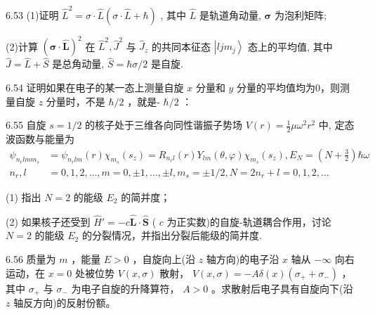 \vfill\newpage

6.53 (1)证明 $\hat{L}^2 = \sigma \cdot \hat{L} (\sigma \cdot \hat{L} +\hbar)$ , 其中 $\hat{L}$ 是轨道角动量, $\pmb{\sigma}$ 为泡利矩阵; 

(2)计算 $(\pmb {\sigma}\cdot \hat{\pmb{L}})^2$ 在 $\hat{L}^2,\hat{J}^2$ 与 $\hat{J}_z$ 的共同本征态 $\left|ljm_j\right\rangle$ 态上的平均值, 其中 $\hat{J} = \hat{L} +\hat{S}$ 是总角动量, $\hat{S} = \hbar \sigma /2$ 是自旋.

\vfill\newpage

6.54 证明如果在电子的某一态上测量自旋 $x$ 分量和 $y$ 分量的平均值均为0，则测量自旋 $z$ 分量时，不是 $\hbar /2$ ，就是- $\hbar /2$ ：

\vfill\newpage

6.55 自旋 $s = 1 / 2$ 的核子处于三维各向同性谐振子势场 $V(r) = \frac{1}{2}\mu \omega^2 r^2$ 中, 定态波函数与能量为
\begin{eqnarray*}
    \psi_ {n _ {r} l m m _ {s}} &= \psi_ {n _ {r} l m} (r) \chi_ {m _ {s}} (s _ {z}) = R _ {n _ {r} l} (r) Y _ {l m} (\theta , \varphi) \chi_ {m _ {s}} (s _ {z}), E _ {N} = \left(N + \frac {3}{2}\right) \hbar \omega\\
    n _ {r}, l &= 0, 1, 2, \dots , m = 0, \pm 1, \dots , \pm l, m _ {s} = \pm 1 / 2, N = 2 n _ {r} + l = 0, 1, 2, \dots
\end{eqnarray*}

(1) 指出 $N = 2$ 的能级 $E_{2}$ 的简并度；

(2) 如果核子还受到 $\hat{H}' = -c\hat{\pmb{L}} \cdot \hat{\pmb{S}}$ ( $c$ 为正实数)的自旋-轨道耦合作用，讨论 $N = 2$ 的能级 $E_{2}$ 的分裂情况，并指出分裂后能级的简并度.

\vfill\newpage

6.56 质量为 $m$ ，能量 $E > 0$ ，自旋向上(沿 $z$ 轴方向)的电子沿 $x$ 轴从 $-\infty$ 向右运动，在 $x = 0$ 处被位势 $V(x, \sigma)$ 散射， $V(x, \sigma) = -A\delta(x)(\sigma_{+} + \sigma_{-})$ ，其中 $\sigma_{+}$ 与 $\sigma_{-}$ 为电子自旋的升降算符， $A > 0$ 。求散射后电子具有自旋向下(沿 $z$ 轴反方向)的反射份额。

\vfill\newpage